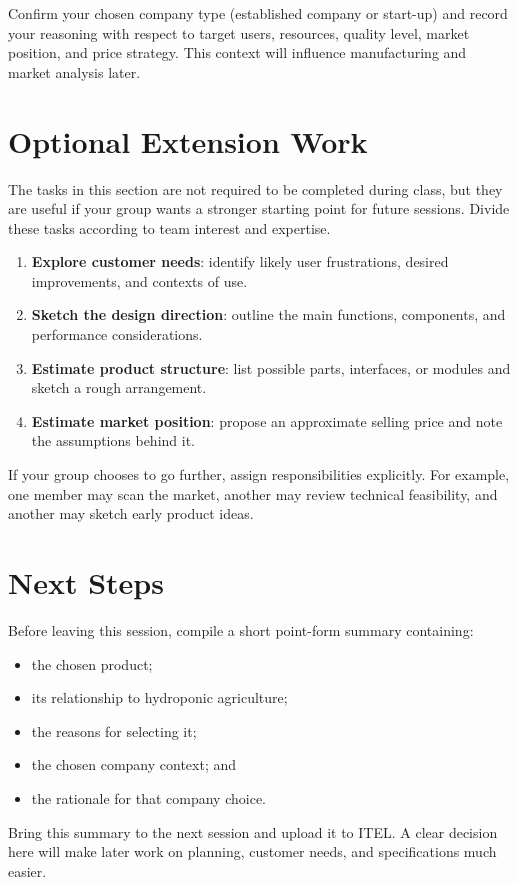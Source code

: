 \begin{tcolorbox}[title=Checkpoint]
Confirm your chosen company type (established company or start-up) and record your reasoning with respect to target users, resources, quality level, market position, and price strategy. This context will influence manufacturing and market analysis later.
\end{tcolorbox}

\section{Optional Extension Work}

The tasks in this section are not required to be completed during class, but they are useful if your group wants a stronger starting point for future sessions. Divide these tasks according to team interest and expertise.

\begin{enumerate}
    \item \textbf{Explore customer needs}: identify likely user frustrations, desired improvements, and contexts of use.
    \item \textbf{Sketch the design direction}: outline the main functions, components, and performance considerations.
    \item \textbf{Estimate product structure}: list possible parts, interfaces, or modules and sketch a rough arrangement.
    \item \textbf{Estimate market position}: propose an approximate selling price and note the assumptions behind it.
\end{enumerate}

If your group chooses to go further, assign responsibilities explicitly. For example, one member may scan the market, another may review technical feasibility, and another may sketch early product ideas.

\section{Next Steps}

Before leaving this session, compile a short point-form summary containing:
\begin{itemize}
    \item the chosen product;
    \item its relationship to hydroponic agriculture;
    \item the reasons for selecting it;
    \item the chosen company context; and
    \item the rationale for that company choice.
\end{itemize}

Bring this summary to the next session and upload it to ITEL. A clear decision here will make later work on planning, customer needs, and specifications much easier.
